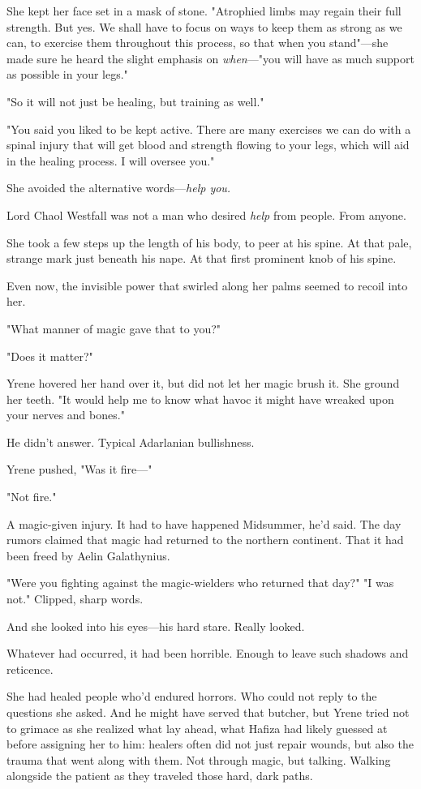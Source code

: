 She kept her face set in a mask of stone. "Atrophied limbs may regain their full strength. But yes. We shall have to focus on ways to keep them as strong as we can, to exercise them throughout this process, so that when you stand"---she made sure he heard the slight emphasis on
\emph{when}---"you will have as much support as possible in your legs."

"So it will not just be healing, but training as well."

"You said you liked to be kept active. There are many exercises we can do with a spinal injury that will get blood and strength flowing to your legs, which will aid in the healing process. I will oversee you."

She avoided the alternative words---\emph{help you.}

Lord Chaol Westfall was not a man who desired \emph{help} from people. From anyone.

She took a few steps up the length of his body, to peer at his spine. At that pale, strange mark just beneath his nape. At that first prominent knob of his spine.

Even now, the invisible power that swirled along her palms seemed to recoil into her.

"What manner of magic gave that to you?"

"Does it matter?"

Yrene hovered her hand over it, but did not let her magic brush it. She ground her teeth. "It would help me to know what havoc it might have wreaked upon your nerves and bones."

He didn't answer. Typical Adarlanian bullishness.

Yrene pushed, "Was it fire---"

"Not fire."

A magic-given injury. It had to have happened  Midsummer, he'd said. The day rumors claimed that magic had returned to the northern continent. That it had been freed by Aelin Galathynius.

"Were you fighting against the magic-wielders who returned that day?" "I was not." Clipped, sharp words.

And she looked into his eyes---his hard stare. Really looked.

Whatever had occurred, it had been horrible. Enough to leave such shadows and reticence.

She had healed people who'd endured horrors. Who could not reply to the questions she asked. And he might have served that butcher, but 
Yrene tried not to grimace as she realized what lay ahead, what Hafiza had likely guessed at before assigning her to him: healers often did not just repair wounds, but also the trauma that went along with them. Not through magic, but  talking. Walking alongside the patient as they traveled those hard, dark paths.

